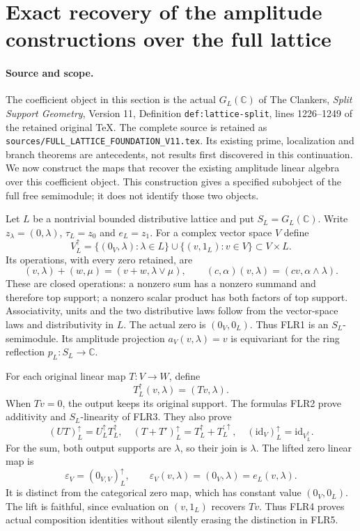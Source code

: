 \documentclass[11pt]{article}
\begin{document}
\section{Exact recovery of the amplitude constructions over the full lattice}
\label{sec:full-lattice-recovery}

\paragraph{Source and scope.}
The coefficient object in this section is the actual $G_L(\mathbb C)$ of
The Clankers, \emph{Split Support Geometry}, Version 11, Definition
\texttt{def:lattice-split}, lines 1226--1249 of the retained original TeX.
The complete source is retained as
\texttt{sources/FULL\_LATTICE\_FOUNDATION\_V11.tex}.
Its existing prime, localization and branch theorems are antecedents,
not results first discovered in this continuation. We now construct
the maps that recover the existing amplitude linear algebra over this
coefficient object. This construction gives a specified subobject of
the full free semimodule; it does not identify those two objects.

Let $L$ be a nontrivial bounded distributive lattice and put
$S_L=G_L(\mathbb C)$. Write $z_\lambda=(0,\lambda)$,
$\tau_L=z_0$ and $e_L=z_1$. For a complex vector space $V$ define
\[
V_L^\uparrow
 =\{(0_V,\lambda):\lambda\in L\}
   \cup\{(v,1_L):v\in V\}\subset V\times L.
\tag{FLR1}
\]
Its operations, with every zero retained, are
\[
(v,\lambda)+(w,\mu)=(v+w,\lambda\vee\mu),\qquad
(c,\alpha)(v,\lambda)=(cv,\alpha\wedge\lambda).
\tag{FLR2}
\]
These are closed operations: a nonzero sum has a nonzero summand and
therefore top support; a nonzero scalar product has both factors of
top support. Associativity, units and the two distributive laws follow
from the vector-space laws and distributivity in $L$.
The actual zero is $(0_V,0_L)$. Thus FLR1 is an $S_L$-semimodule.
Its amplitude projection $a_V(v,\lambda)=v$ is equivariant for
the ring reflection $p_L:S_L\to\mathbb C$.

For each original linear map $T:V\to W$, define
\[
T_L^\uparrow(v,\lambda)=(Tv,\lambda).
\tag{FLR3}
\]
When $Tv=0$, the output keeps its original support. The formulas FLR2
prove additivity and $S_L$-linearity of FLR3. They also prove
\[
(UT)_L^\uparrow=U_L^\uparrow T_L^\uparrow,\quad
(T+T')_L^\uparrow=T_L^\uparrow+T_L^{\prime\uparrow},\quad
(\mathrm{id}_V)_L^\uparrow=\mathrm{id}_{V_L^\uparrow}.
\tag{FLR4}
\]
For the sum, both output supports are $\lambda$, so their join is
$\lambda$. The lifted zero linear map is
\[
\varepsilon_V=(0_{V,V})_L^\uparrow,
\qquad\varepsilon_V(v,\lambda)=(0_V,\lambda)=e_L(v,\lambda).
\tag{FLR5}
\]
It is distinct from the categorical zero map, which has constant value
$(0_V,0_L)$. The lift is faithful, since evaluation on $(v,1_L)$
recovers $Tv$. Thus FLR4 proves actual composition identities without
silently erasing the distinction in FLR5.
\end{document}
